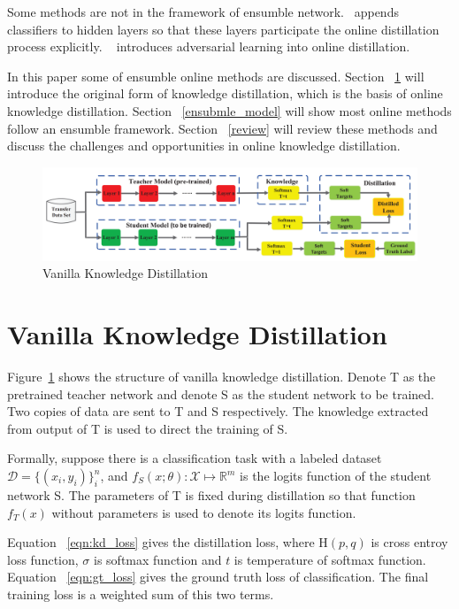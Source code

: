 \documentclass[10pt,twocolumn,letterpaper]{article}
\begin{document}
Some methods are not in the framework of ensumble network.~\cite{yao2020knowledge} appends classifiers to hidden layers so that these layers participate the online distillation process explicitly.
~\cite{chung2020feature} introduces adversarial learning into online distillation.

In this paper some of ensumble online methods are discussed.
Section ~\ref{vanilla_kd} will introduce the original form of knowledge distillation, which is the basis of online knowledge distillation.
Section ~\ref{ensubmle_model} will show most online methods follow
an ensumble framework.
Section ~\ref{review} will review these methods and discuss the challenges and opportunities in online knowledge distillation.
\begin{figure}
   \begin{center}
   \includegraphics[width=0.9\linewidth]{vanilla_kd.png}
   \end{center}
      \caption{Vanilla Knowledge Distillation}
   \label{fig:vanilla_kd}
\end{figure}
   
\section{Vanilla Knowledge Distillation}\label{vanilla_kd}
Figure~\ref{fig:vanilla_kd} shows the structure of vanilla knowledge distillation. Denote T as the pretrained teacher network and
denote S as the student network to be trained. Two copies of data are sent to T and S respectively.
The knowledge extracted from output of T is used to direct the training of S.

Formally, suppose there is a classification task with a labeled dataset $\mathcal D=\{(x_i, y_i)\}_i^n$, and $f_S(x;\theta):\mathcal X\mapsto\mathbb{R}^m$ is the logits function of the student network S. The parameters of T is fixed
during distillation so that function $f_T(x)$ without parameters is used to denote its logits function.

Equation ~\eqref{eqn:kd_loss} gives the distillation loss, where $\textrm{H}(p, q)$ is cross entroy loss function, $\sigma$ is softmax function and $t$ is temperature of softmax function. Equation ~\eqref{eqn:gt_loss} gives the
ground truth loss of classification. The final training loss is a weighted sum of this two terms.
\end{document}
